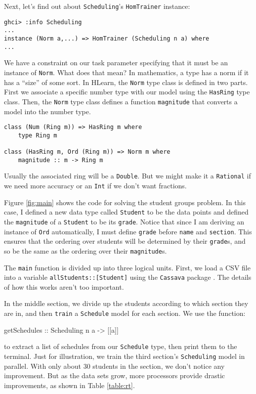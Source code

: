 \documentclass[tikz]{tmr}
\newcommand\h{\lstinline}
\newcommand\+{\mdoubleplus}
\begin{document}
Next, let's find out about \h{Scheduling}'s \h{HomTrainer} instance:
\begin{lstlisting}
ghci> :info Scheduling
...
instance (Norm a,...) => HomTrainer (Scheduling n a) where
...
\end{lstlisting}
We have a constraint on our task parameter specifying that it must be an instance of \h{Norm}.
What does that mean?
In mathematics, a type has a norm if it has a ``size'' of some sort. %
In HLearn, the \h{Norm} type class is defined in two parts.
First we associate a specific number type with our model using the \h{HasRing} type class.
Then, the \h{Norm} type class defines a function \h{magnitude} that converts a model into the number type.
\begin{lstlisting}
class (Num (Ring m)) => HasRing m where
    type Ring m

class (HasRing m, Ord (Ring m)) => Norm m where
    magnitude :: m -> Ring m
\end{lstlisting}
Usually the associated ring will be a \h{Double}.
But we might make it a \h{Rational} if we need more accuracy or an \h{Int} if we don't want fractions.

Figure \ref{fig:main} shows the code for solving the student groups problem.
In this case, I defined a new data type called \h{Student} to be the data points and defined the \h{magnitude} of a \h{Student} to be its \h{grade}.
Notice that since I am deriving an instance of \h{Ord} automatically, I must define \h{grade} before \h{name} and \h{section}.
This ensures that the ordering over students will be determined by their \h{grade}s, and so be the same as the ordering over their \h{magnitude}s.

The \h{main} function is divided up into three logical units.
First, we load a CSV file into a variable
\h{allStudents::[Student]}
using the \h{Cassava} package \cite{cassava}.
The details of how this works aren't too important.

In the middle section, we divide up the students according to which section they are in, and then \h{train} a \h{Schedule} model for each section.
We use the function:
\begin{spec}
getSchedules :: Scheduling n a -> [[a]]
\end{spec}
to extract a list of schedules from our \h{Schedule} type, then print them to the terminal.
Just for illustration, we train the third section's \h{Scheduling} model in parallel.
With only about 30 students in the section, we don't notice any improvement.
But as the data sets grow, more processors provide drastic improvements, as shown in Table \ref{table:rt}.
\end{document}

